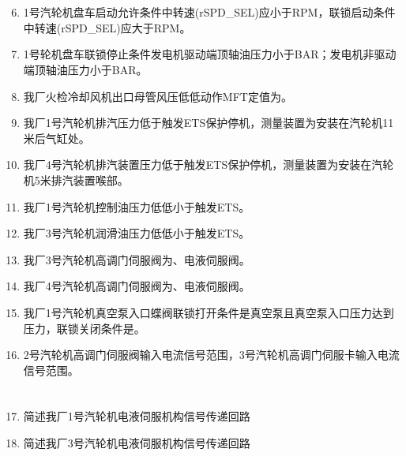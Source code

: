 \documentclass{book}
\begin{document}
\section{}
\begin{enumerate}
	\setcounter{enumi}{5}
	\item 1号汽轮机盘车启动允许条件中转速(rSPD\_SEL)应小于RPM，联锁启动条件中转速(rSPD\_SEL)应大于RPM。
	\item 1号轮机盘车联锁停止条件发电机驱动端顶轴油压力小于BAR；发电机非驱动端顶轴油压力小于BAR。
	\item 我厂火检冷却风机出口母管风压低低动作MFT定值为。
	\item 我厂1号汽轮机排汽压力低于触发ETS保护停机，测量装置为安装在汽轮机11米后气缸处。
	\item 我厂4号汽轮机排汽装置压力低于触发ETS保护停机，测量装置为安装在汽轮机5米排汽装置喉部。
	\item 我厂1号汽轮机控制油压力低低小于触发ETS。
	\item 我厂3号汽轮机润滑油压力低低小于触发ETS。
	\item 我厂3号汽轮机高调门伺服阀为、电液伺服阀。	
	\item 我厂4号汽轮机高调门伺服阀为、电液伺服阀。
	\item 我厂1号汽轮机真空泵入口蝶阀联锁打开条件是真空泵且真空泵入口压力达到压力，联锁关闭条件是。
	\item 2号汽轮机高调门伺服阀输入电流信号范围，3号汽轮机高调门伺服卡输入电流信号范围。
\end{enumerate}
\section{}
\begin{enumerate}
	\setcounter{enumi}{16}
	\item 简述我厂1号汽轮机电液伺服机构信号传递回路
	\item 简述我厂3号汽轮机电液伺服机构信号传递回路
\end{enumerate}
\end{document}
